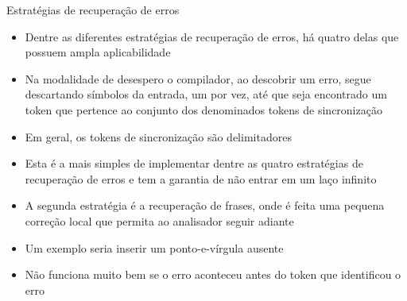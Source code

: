 \begin{frame}[fragile]{Estratégias de recuperação de erros}

    \begin{itemize}
        \item Dentre as diferentes estratégias de recuperação de erros, há quatro delas que possuem ampla aplicabilidade

        \item Na modalidade de desespero o compilador, ao descobrir um erro, segue descartando símbolos da entrada, um por vez, até que seja encontrado um token
            que pertence ao conjunto dos denominados tokens de sincronização

        \item Em geral, os tokens de sincronização são delimitadores

        \item Esta é a mais simples de implementar dentre as quatro estratégias de recuperação de erros e tem a garantia de não entrar em um laço infinito

        \item A segunda estratégia é a recuperação de frases, onde é feita uma pequena correção local que permita ao analisador seguir adiante

        \item Um exemplo seria inserir um ponto-e-vírgula ausente 

        \item Não funciona muito bem se o erro aconteceu antes do token que identificou o erro
    \end{itemize}

\end{frame}

